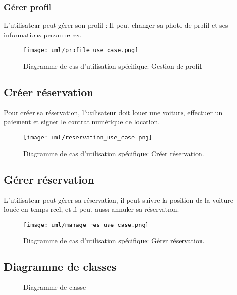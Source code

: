 \subsubsection{Gérer profil}
L'utilisateur peut gérer son profil : Il peut changer sa photo de profil et ses informations personnelles.\\
\begin{figure}[H]
    \centering
    \texttt{[image: uml/profile\_use\_case.png]}
    \vspace{1cm}
    \captionsetup{justification=centering}
    \caption{Diagramme de cas d'utilisation spécifique: Gestion de profil.}
    \label{fig:use_case_manage_profile}
\end{figure}
\subsection{Créer réservation}
Pour créer sa réservation, l'utilisateur doit louer une voiture, effectuer un paiement et signer le contrat numérique de location.\\
\begin{figure}[H]
    \centering
    \texttt{[image: uml/reservation\_use\_case.png]}
    \vspace{1cm}
    \captionsetup{justification=centering}
    \caption{Diagramme de cas d'utilisation spécifique: Créer réservation.}
    \label{fig:use_case_create_res}
\end{figure}
\subsection{Gérer réservation}
L'utilisateur peut gérer sa réservation, il peut suivre la position de la voiture louée en temps réel, et il peut aussi annuler sa réservation.
\begin{figure}[H]
    \centering
    \texttt{[image: uml/manage\_res\_use\_case.png]}
    \vspace{1cm}
    \captionsetup{justification=centering}
    \caption{Diagramme de cas d'utilisation spécifique: Gérer réservation.}
    \label{fig:use_case_manage_res}
\end{figure}


\subsection{Diagramme de classes}
\begin{figure}[H]
    \centering
    \vspace{1cm}
    \captionsetup{justification=centering}

    \caption{Diagramme de classe}
    \label{fig:class_diag}
\end{figure}
\clearpage
